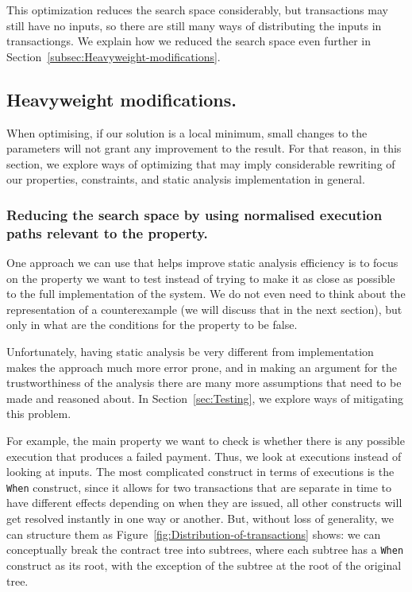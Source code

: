 \documentclass[english,runningheads]{llncs}
\begin{document}
This optimization reduces the search space considerably, but transactions
may still have no inputs, so there are still many ways of distributing
the inputs in transactiongs. We explain how we reduced
the search space even further in Section~\ref{subsec:Heavyweight-modifications}. 

\subsection{Heavyweight modifications. \label{subsec:Heavyweight-modifications}}

When optimising, if our solution is a local minimum, small changes
to the parameters will not grant any improvement to the result.
For that reason, in this section, we explore ways of optimizing that
may imply considerable rewriting of our properties, constraints, and
static analysis implementation in general.


\subsubsection{Reducing the search space by using normalised execution paths relevant
to the property. \label{subsec:Reducing-search-space-by-using-normalised-execution-paths-relevant-to-the-property}}

One approach we can use that helps improve static analysis efficiency
is to focus on the property we want to test instead of trying to make
it as close as possible to the full implementation
of the system. We do not even need to think about the representation
of a counterexample (we will discuss that in the next section), but
only in what are the conditions for the property to be false.

Unfortunately, having static analysis be very different from implementation
makes the approach much more error prone, and in making an argument
for the trustworthiness of the analysis there are many more assumptions
that need to be made and reasoned about. In Section~\ref{sec:Testing},
we explore ways of mitigating this problem.

For example, the main property we want to check is whether there is
any possible execution that produces a failed payment. Thus, we look
at executions instead of looking at inputs. The most complicated construct
in terms of executions is the \texttt{When} construct, since it allows
for two transactions that are separate in time to have different effects
depending on when they are issued, all other constructs will get resolved
instantly in one way or another. But, without loss of generality,
we can structure them as Figure~\ref{fig:Distribution-of-transactions}
shows: we can conceptually break the contract tree into subtrees,
where each subtree has a \texttt{When} construct as its root, with
the exception of the subtree at the root of the original tree.
\end{document}
